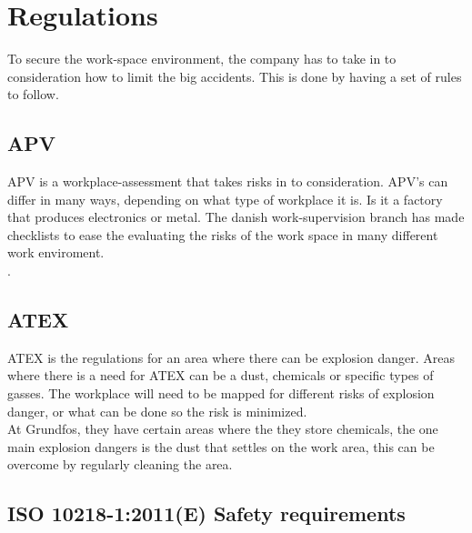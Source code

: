 \chapter{Regulations}\label{ch:regulation}
To secure the work-space environment, the company has to take in to consideration how to limit the big accidents. This is done by having a set of rules to follow.\\

\section{APV}
APV is a workplace-assessment that takes risks in to consideration. APV's can differ in many ways, depending on what type of workplace it is. Is it a factory that produces electronics or metal. The danish work-supervision branch has made checklists to ease the evaluating the risks of the work space in many different work enviroment\cite{Apv}. \\
\cite{Risikovurdering}.

\section{ATEX}
ATEX is the regulations for an area where there can be explosion danger. Areas where there is a need for ATEX can be a dust, chemicals or specific types of gasses. The workplace will need to be mapped for different risks of explosion danger, or what can be done so the risk is minimized.\\
At Grundfos, they have certain areas where the they store chemicals, the one main explosion dangers is the dust that settles on the work area, this can be overcome by regularly cleaning the area\cite{ATEX}.  

\section{ISO 10218-1:2011(E) Safety requirements}

